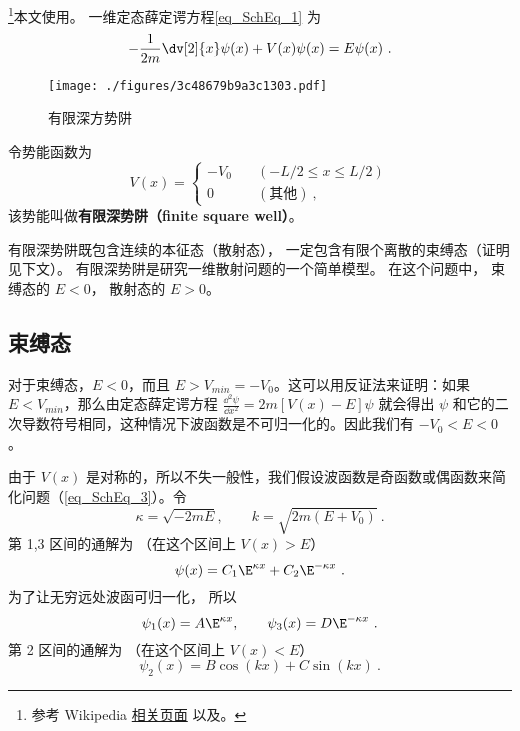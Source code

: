 
\begin{issues}
\issueTODO
\end{issues}




\footnote{参考 Wikipedia \href{https://en.wikipedia.org/wiki/Finite_potential_well}{相关页面} 以及\cite{GriffQ}。}本文使用。 一维定态薛定谔方程\autoref{eq_SchEq_1} 为
\begin{equation}
-\frac{1}{2m}\dv[2]{x}\psi(x) + V(x) \psi(x) = E \psi(x)~.
\end{equation}

\begin{figure}[ht]
\centering
\texttt{[image: ./figures/3c48679b9a3c1303.pdf]}
\caption{有限深方势阱} \label{fig_FSW_1}
\end{figure}
令势能函数为
\begin{equation}
V(x) = \begin{cases}
-V_0 \quad &(-L/2 \leqslant x \leqslant L/2)\\
0 \quad &(\text{其他})~,
\end{cases}
\end{equation}
该势能叫做\textbf{有限深势阱（finite square well）}。

有限深势阱既包含连续的本征态（散射态）， 一定包含有限个离散的束缚态（证明见下文）。 有限深势阱是研究一维散射问题的一个简单模型。 在这个问题中， 束缚态的 $E<0$， 散射态的 $E>0$。

\subsection{束缚态}
对于束缚态，$E<0$，而且 $E> V_{min}=-V_0$。这可以用反证法来证明：如果 $E<V_{min}$，那么由定态薛定谔方程 $\frac{\dd {^2}\psi}{\dd x^2}=2m[V(x)-E]\psi$ 就会得出 $\psi$ 和它的二次导数符号相同，这种情况下波函数是不可归一化的。因此我们有 $-V_0<E<0$。

由于 $V(x)$ 是对称的，所以不失一般性，我们假设波函数是奇函数或偶函数来简化问题（\autoref{eq_SchEq_3}）。令
\begin{equation}\label{eq_FSW_4}
\kappa = \sqrt{-2mE}, \qquad k = \sqrt{2m(E + V_0)}~.
\end{equation}
第 1,3 区间的通解为 （在这个区间上 $V(x) > E$）
\begin{equation}
\psi(x) = C_1 \E^{\kappa x} + C_2 \E^{-\kappa x}~.
\end{equation}
为了让无穷远处波函可归一化， 所以
\begin{equation}
\psi_1(x) = A \E^{\kappa x}, \qquad \psi_3(x) = D\E^{-\kappa x}~.
\end{equation}
第 2 区间的通解为 （在这个区间上 $V(x) < E$）
\begin{equation}
\psi_2(x) = B \cos(k x) + C\sin(k x)~.
\end{equation}

